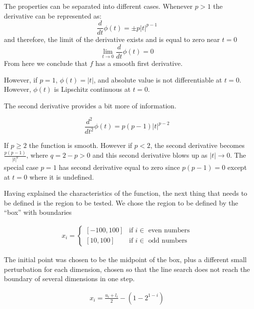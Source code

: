 The properties can be separated into different cases. Whenever $p > 1$ the derivative can be represented as:
\begin{equation}\label{firstderiv}
  \frac{d}{dt} \phi(t) = \pm p |t|^{p-1}
\end{equation}
and therefore, the limit of the derivative exists and is equal to zero near $t = 0$ \[ \lim_{t \to 0} \frac{d}{dt}\phi(t) = 0 \] From here we conclude that $f$ has a smooth first derivative.

However, if $p = 1$, $\phi(t) = |t|$, and absolute value is not differentiable at $t = 0$. However, $\phi(t)$ is Lipschitz continuous at $t = 0$.

The second derivative provides a bit more of information.

\begin{equation}\label{secondderiv}
  \frac{d^2}{dt^2} \phi(t) = p(p-1) |t|^{p-2}
\end{equation}

If $p \geq 2$ the function is smooth. However if $p < 2$, the second derivative becomes $\frac{p(p-1)}{|t|^{q}}$, where $q = 2 - p > 0$ and this second derivative blows up as $|t| \to 0$. The special case $p = 1$ has second derivative equal to zero since $p(p-1) = 0$ except at $t = 0$ where it is undefined.

Having explained the characteristics of the function, the next thing that needs to be defined is the region to be tested. We chose the region to be defined by the ``box'' with boundaries

\begin{equation}
  \begin{aligned}
    x_i = 
    \begin{cases}
      [-100, 100] & \text{if } i \in \text{ even numbers} \\
      [10, 100] & \text{if } i \in \text{ odd numbers}
    \end{cases}
  \end{aligned}
\end{equation}

The initial point was chosen to be the midpoint of the box, plus a different small perturbation for each dimension, chosen so that the line search does not reach the boundary of several dimensions in one step.

\begin{equation}
  \begin{aligned}
    x_i = \frac{u_i + l_i}{2} - \left(1 - 2^{1 - i}\right)
  \end{aligned}
\end{equation}

